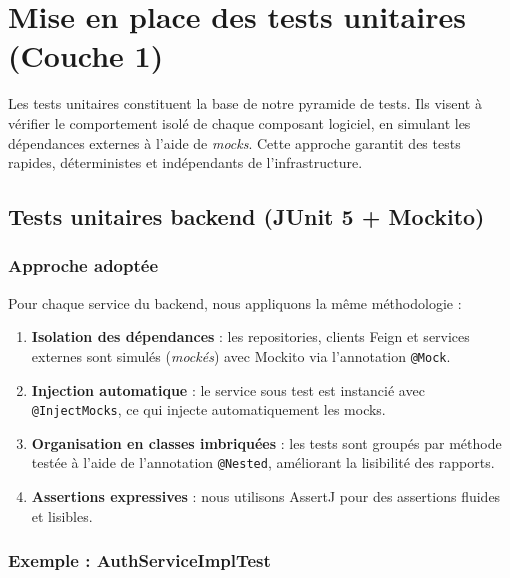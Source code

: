 \section{Mise en place des tests unitaires (Couche 1)}
\label{sec:tests-unitaires}

Les tests unitaires constituent la base de notre pyramide de tests. Ils visent à vérifier
le comportement isolé de chaque composant logiciel, en simulant les dépendances externes
à l'aide de \textit{mocks}. Cette approche garantit des tests rapides, déterministes et
indépendants de l'infrastructure.

\subsection{Tests unitaires backend (JUnit 5 + Mockito)}
\label{subsec:tests-unitaires-backend}

\subsubsection{Approche adoptée}

Pour chaque service du backend, nous appliquons la même méthodologie :

\begin{enumerate}
  \item \textbf{Isolation des dépendances} : les repositories, clients Feign et services
        externes sont simulés (\textit{mockés}) avec Mockito via l'annotation
        \texttt{@Mock}.
  \item \textbf{Injection automatique} : le service sous test est instancié avec
        \texttt{@InjectMocks}, ce qui injecte automatiquement les mocks.
  \item \textbf{Organisation en classes imbriquées} : les tests sont groupés par
        méthode testée à l'aide de l'annotation \texttt{@Nested}, améliorant
        la lisibilité des rapports.
  \item \textbf{Assertions expressives} : nous utilisons AssertJ pour des assertions
        fluides et lisibles.
\end{enumerate}

\subsubsection{Exemple : AuthServiceImplTest}


